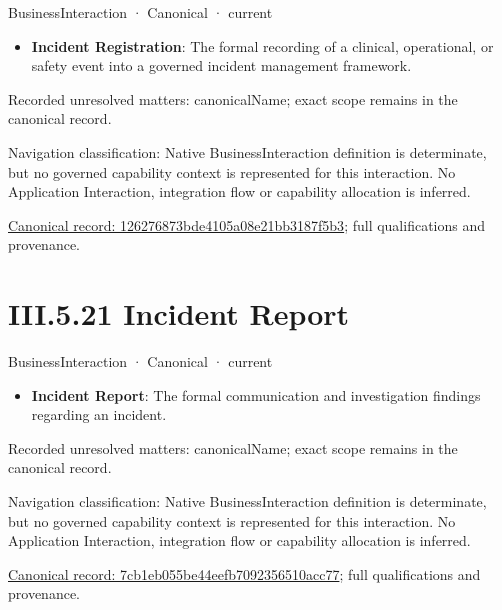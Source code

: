 \label{element:126276873bde4105a08e21bb3187f5b3}
{\small BusinessInteraction · Canonical · current}\par

\begin{itemize}


\item \textbf{Incident Registration}: The formal recording of a clinical, operational, or safety event into a governed incident management framework.

\end{itemize}

{\small Recorded unresolved matters: canonicalName; exact scope remains in the canonical record.}\par
{\small Navigation classification: Native BusinessInteraction definition is determinate, but no governed capability context is represented for this interaction. No Application Interaction, integration flow or capability allocation is inferred.}\par
{\footnotesize \href{../../../../../../../../continuum/business/business-interaction/126276873bde4105a08e21bb3187f5b3.md}{Canonical record: 126276873bde4105a08e21bb3187f5b3}; full qualifications and provenance.}\par
\section*{III.5.21 Incident Report}
\label{navigation:III.5.21}

\label{element:7cb1eb055be44eefb7092356510acc77}
{\small BusinessInteraction · Canonical · current}\par

\begin{itemize}


\item \textbf{Incident Report}: The formal communication and investigation findings regarding an incident.

\end{itemize}

{\small Recorded unresolved matters: canonicalName; exact scope remains in the canonical record.}\par
{\small Navigation classification: Native BusinessInteraction definition is determinate, but no governed capability context is represented for this interaction. No Application Interaction, integration flow or capability allocation is inferred.}\par
{\footnotesize \href{../../../../../../../../continuum/business/business-interaction/7cb1eb055be44eefb7092356510acc77.md}{Canonical record: 7cb1eb055be44eefb7092356510acc77}; full qualifications and provenance.}\par
